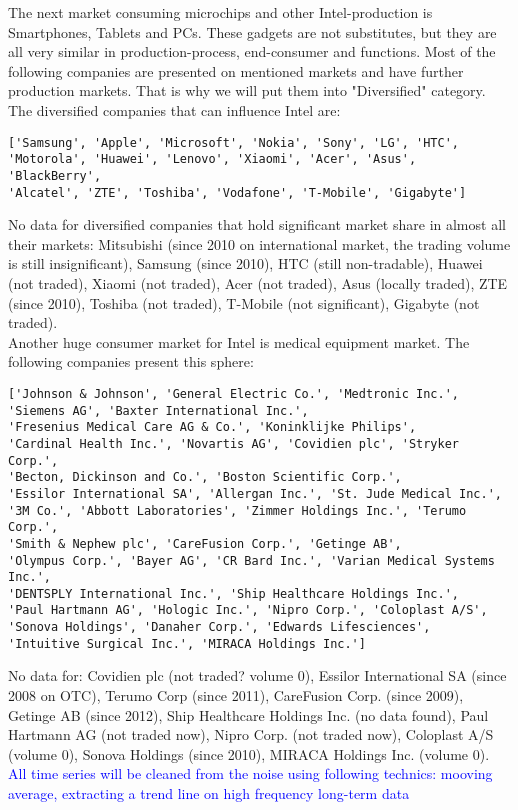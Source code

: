 \documentclass {article}
\begin{document}
The next market consuming microchips and other Intel-production is Smartphones, Tablets and PCs. These gadgets are not substitutes, but they are all very similar in production-process, end-consumer and functions. Most of the following companies are presented on mentioned markets and have further production markets. That is why we will put them into "Diversified" category. The diversified companies that can influence Intel are:
\begin{verbatim}
['Samsung', 'Apple', 'Microsoft', 'Nokia', 'Sony', 'LG', 'HTC',
'Motorola', 'Huawei', 'Lenovo', 'Xiaomi', 'Acer', 'Asus', 'BlackBerry',
'Alcatel', 'ZTE', 'Toshiba', 'Vodafone', 'T-Mobile', 'Gigabyte']
\end{verbatim} 
No data for diversified companies that hold significant market share in almost all their markets: Mitsubishi (since 2010 on international market, the trading volume is still insignificant), Samsung (since 2010), HTC (still non-tradable), Huawei (not traded), Xiaomi (not traded), Acer (not traded), Asus (locally traded), ZTE (since 2010), Toshiba (not traded), T-Mobile (not significant), Gigabyte (not traded). \\
Another huge consumer market for Intel is medical equipment market. The following companies present this sphere:
\begin{verbatim}
['Johnson & Johnson', 'General Electric Co.', 'Medtronic Inc.',
'Siemens AG', 'Baxter International Inc.',
'Fresenius Medical Care AG & Co.', 'Koninklijke Philips',
'Cardinal Health Inc.', 'Novartis AG', 'Covidien plc', 'Stryker Corp.',
'Becton, Dickinson and Co.', 'Boston Scientific Corp.',
'Essilor International SA', 'Allergan Inc.', 'St. Jude Medical Inc.',
'3M Co.', 'Abbott Laboratories', 'Zimmer Holdings Inc.', 'Terumo Corp.',
'Smith & Nephew plc', 'CareFusion Corp.', 'Getinge AB',
'Olympus Corp.', 'Bayer AG', 'CR Bard Inc.', 'Varian Medical Systems Inc.',
'DENTSPLY International Inc.', 'Ship Healthcare Holdings Inc.',
'Paul Hartmann AG', 'Hologic Inc.', 'Nipro Corp.', 'Coloplast A/S',
'Sonova Holdings', 'Danaher Corp.', 'Edwards Lifesciences',
'Intuitive Surgical Inc.', 'MIRACA Holdings Inc.']
\end{verbatim}
No data for: Covidien plc (not traded? volume 0), Essilor International SA (since 2008 on OTC), Terumo Corp (since 2011), CareFusion Corp. (since 2009), Getinge AB (since 2012), Ship Healthcare Holdings Inc. (no data found), Paul Hartmann AG (not traded now), Nipro Corp. (not traded now), Coloplast A/S (volume 0), Sonova Holdings (since 2010), MIRACA Holdings Inc. (volume 0).\\  
\textcolor{blue}{All time series will be cleaned from the noise using following technics: mooving average, extracting a trend line on high frequency long-term data} 
\end{document}
